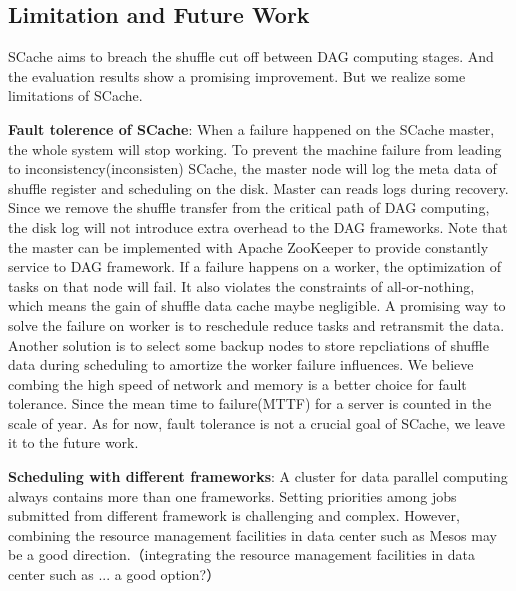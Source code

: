 \subsection{Limitation and Future Work}
SCache aims to breach the shuffle cut off between DAG computing stages. And the evaluation results show a promising improvement. But we realize some limitations of SCache. 

\textbf{Fault tolerence of SCache}: When a failure happened on the SCache master, the whole system will stop working. To prevent the machine failure from leading to inconsistency(inconsisten) SCache, the master node will log the meta data of shuffle register and scheduling on the disk. Master can reads logs during recovery. Since we remove the shuffle transfer from the critical path of DAG computing, the disk log will not introduce extra overhead to the DAG frameworks. Note that the master can be implemented with Apache ZooKeeper\cite{zookeeper} to provide constantly service to DAG framework. If a failure happens on a worker, the optimization of tasks on that node will fail. It also violates the constraints of all-or-nothing, which means the gain of shuffle data cache maybe negligible. A promising way to solve the failure on worker is to reschedule reduce tasks and retransmit the data. Another solution is to select some backup nodes to store repcliations of shuffle data during scheduling to amortize the worker failure influences. We believe combing the high speed of network and memory is a better choice for fault tolerance. Since the mean time to failure(MTTF) for a server is counted in the scale of year\cite{tachyon}. As for now, fault tolerance is not a crucial goal of SCache,  we leave it to the future work.  

\textbf{Scheduling with different frameworks}: A cluster for data parallel computing always contains more than one frameworks. Setting priorities among jobs submitted from different framework is challenging and complex. However, combining the resource management facilities in data center such as Mesos\cite{mesos} may be a good direction.（integrating the resource management facilities in data center such as ... a good option?）